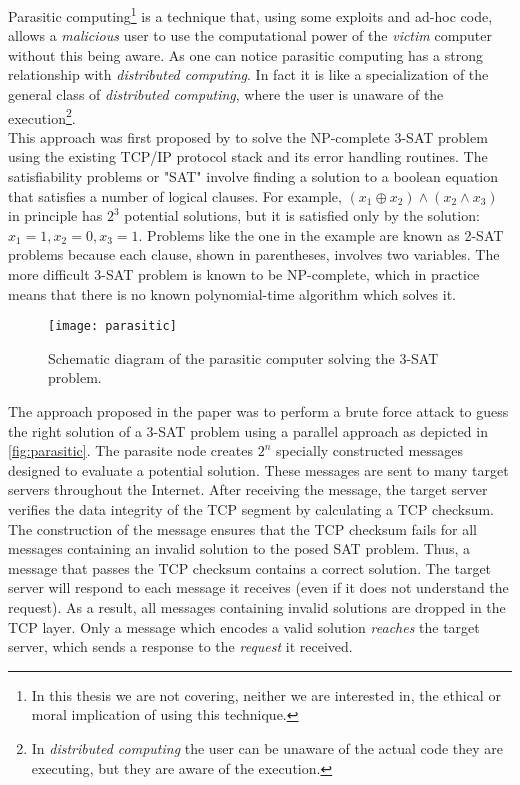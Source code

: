 Parasitic computing\footnote{In this thesis we are not covering, neither
we are interested in, the ethical or moral implication of using this technique.}
is a technique that, using some exploits and ad-hoc code, allows a \emph{malicious}
user to use the computational power of the \emph{victim} computer without this
being aware. As one can notice parasitic computing has a strong relationship
with \emph{distributed computing}. In fact it is like a specialization of the general
class of \emph{distributed computing}, where the user is unaware of
the execution\footnote{In \emph{distributed computing} the user can be unaware
of the actual code they are executing, but they are aware of the execution.}.\\

This approach was first proposed by \cite{barabasi2001parasitic} to solve the
NP-complete 3-SAT problem using the existing TCP/IP protocol stack and its error
handling routines. The satisfiability problems or "SAT" involve finding a
solution to a boolean equation that satisfies a number of logical clauses. For
example, $(x_1 \oplus x_2) \land (x_2 \land x_3 )$ in principle has $2^3$ potential
solutions, but it is satisfied only by the solution: $x_1=1, x_2=0, x_3=1$.
Problems like the one in the example are known as 2-SAT problems because
each clause, shown in parentheses, involves two variables. The more difficult
3-SAT problem is known to be NP-complete, which in practice means that there is
no known polynomial-time algorithm which solves it.\\
\begin{figure}[htb]
    \centering
    \texttt{[image: parasitic]}
    \caption{Schematic diagram of the parasitic computer solving the 3-SAT
    problem.}
    \label{fig:parasitic}
\end{figure}

The approach proposed in the paper was to perform a brute force attack to guess
the right solution of a 3-SAT problem using a parallel approach as depicted in
\autoref{fig:parasitic}. The parasite node creates $2^n$ specially constructed
messages designed to evaluate a potential solution. These messages are sent to
many target servers throughout the Internet. After receiving the message, the
target server verifies the data integrity of the TCP segment by calculating a
TCP checksum. The construction of the message ensures that the TCP checksum fails
for all messages containing an invalid solution to the posed SAT problem. Thus,
a message that passes the TCP checksum contains a correct solution. The target
server will respond to each message it receives (even if it does not understand
the request). As a result, all messages containing invalid solutions are dropped
in the TCP layer. Only a message which encodes a valid solution \emph{reaches}
the target server, which sends a response to the \emph{request} it received.\\

